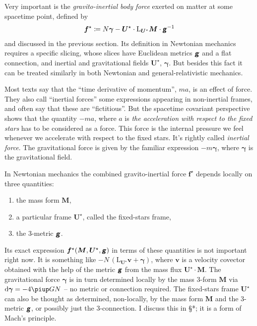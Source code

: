 \documentclass[\ifafour a4paper,12pt,\else a5paper,10pt,\fi%
onecolumn,oneside,article,%
british%
]{memoir}
\theoremstyle{remark}
\theoremstyle{innote}
\newcommand*{\mathte}[1]{\textbf{\textit{\textsf{#1}}}}
\newcommand*{\de}{\partialup}%
\newcommand*{\pu}{\piup}%
\newcommand*{\di}{\mathrm{d}}%
\newcommand*{\defd}{\coloneqq}
\renewcommand*{\|}[1][]{\nonscript\,#1\vert\nonscript\;\mathopen{}}
\newcommand*{\sect}{\S}%
\newcommand*{\Li}{\mathrm{L}}
\newcommand*{\yd}{N}
\newcommand*{\yrr}{M}
\newcommand*{\yr}{\bm{\yrr}}
\newcommand*{\ybb}{f}
\newcommand*{\yb}{\bm{\ybb}}
\newcommand*{\ybi}{\yb^{\mathord{\star}}}
\newcommand*{\yxxt}{x}
\newcommand*{\yxt}{\bm{\yxxt}}
\newcommand*{\yxto}{\bm{\yxxt}^{\mathord{\star}}}
\newcommand*{\yvvt}{v}
\newcommand*{\yvt}{\bm{\yvvt}}
\newcommand*{\yffg}{\gamma}
\newcommand*{\yfg}{\bm{\yffg}}
\newcommand*{\yomm}{\varOmega}
\newcommand*{\yom}{\bm{\yomm}^{\mathord{\star}}}
\newcommand*{\yFF}{U}
\newcommand*{\yF}{\bm{\yFF}}
\newcommand*{\yFi}{\yF^{\mathord{\star}}}
\newcommand*{\ygg}{g}
\newcommand*{\yg}{\mathte{\ygg}}
\begin{document}
Very important is the \emph{gravito-inertial body force} exerted on matter at some spacetime point, defined by 
\begin{equation}
  \label{eq:gravito-inertial_force_tentative}
  \ybi \defd \yd\yfg - \yFi \cdot \Li_{\yFi}\yr \cdot \yg^{-1}
\end{equation}
and discussed in the previous section. Its definition in Newtonian
mechanics requires a specific slicing, whose slices have Euclidean
metrics $\yg$ and a flat connection, and inertial and gravitational fields
$\yFi$, $\yfg$. But besides this fact it can be treated similarly in both
Newtonian and general-relativistic mechanics.

Most texts say that the \enquote{time derivative of momentum}, $ma$, is an
effect of force. They also call \enquote{inertial forces} some expressions
appearing in non-inertial frames, and often say that these are
\enquote{fictitious}. But the spacetime covariant perspective shows that
the quantity $-ma$, where $a$ is \emph{the acceleration with respect to the
  fixed stars} has to be considered as a force. This force is the internal
pressure we feel whenever we accelerate with respect to the fixed stars.
It's rightly called \emph{inertial force}. The gravitational force is given
by the familiar expression $-m \yfg$, where $\yfg$ is the gravitational
field.


In Newtonian mechanics the combined gravito-inertial force $\ybi$ depends
locally on three quantities:
\begin{enumerate}[label=(\arabic*)]\tightlist
\item the mass form $\yr$,
\item a particular frame $\yFi$, called the fixed-stars frame,
\item the 3-metric $\yg$.
\end{enumerate}
Its exact expression $\ybi(\yr,\yFi,\yg)$ in terms of these quantities is
not important right now. It is something like
$-\yd \,(\Li_{\yFi}\yvt + \yfg)$, where $\yvt$ is a velocity covector
obtained with the help of the metric $\yg$ from the mass flux
$\yFi\cdot\yr$. The gravitational force $\yfg$ is in turn determined
locally by the mass 3-form $\yr$ via $\di\yfg = - 4\pu G \yd$ -- no metric
or connection required. The fixed-stars frame $\yFi$ can also be thought as
determined, non-locally, by the mass form $\yr$ and the 3-metric $\yg$, or
possibly just the 3-connection. I discuss this in \sect**; it is a form of
Mach's principle.
\end{document}
